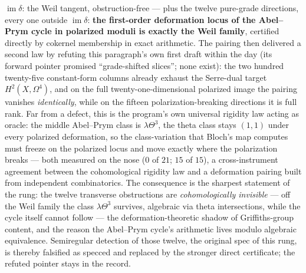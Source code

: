 \documentclass[11pt]{article}
\theoremstyle{definition}
\theoremstyle{remark}
\begin{document}
$\operatorname{im}\delta$: the Weil tangent, obstruction-free --- plus the
twelve pure-grade directions, every one outside $\operatorname{im}\delta$:
\textbf{the first-order deformation locus of the Abel--Prym cycle in
polarized moduli is exactly the Weil family}, certified directly by
cokernel membership in exact arithmetic. The pairing then delivered a
second law by refuting this paragraph's own first draft within the day
(its forward pointer promised ``grade-shifted slices''; none exist): the
two hundred twenty-five constant-form columns already exhaust the
Serre-dual target $H^2(X,\Omega^4)$, and on the full twenty-one-dimensional
polarized image the pairing vanishes \emph{identically}, while on the
fifteen polarization-breaking directions it is full rank. Far from a
defect, this is the program's own universal rigidity law acting as oracle:
the middle Abel--Prym class is $\lambda\Theta^3$, the theta class stays
$(1,1)$ under every polarized deformation, so the class-variation that
Bloch's map computes must freeze on the polarized locus and move exactly
where the polarization breaks --- both measured on the nose ($0$ of $21$;
$15$ of $15$), a cross-instrument agreement between the cohomological
rigidity law and a deformation pairing built from independent
combinatorics. The consequence is the sharpest statement of the rung: the
twelve transverse obstructions are \emph{cohomologically invisible} ---
off the Weil family the class $\lambda\Theta^3$ survives, algebraic via
theta intersections, while the cycle itself cannot follow --- the
deformation-theoretic shadow of Griffiths-group content, and the reason
the Abel--Prym cycle's arithmetic lives modulo algebraic equivalence.
Semiregular detection of those twelve, the original spec of this rung, is
thereby falsified as specced and replaced by the stronger direct
certificate; the refuted pointer stays in the record.
\end{document}
